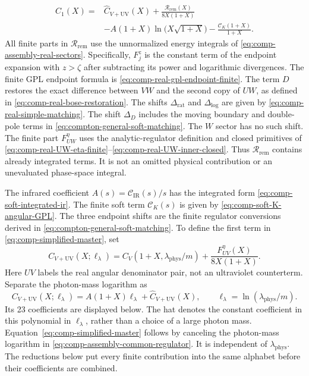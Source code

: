 \begin{equation}
 \begin{aligned}
 C_1(X)={}&\widehat C_{V+\mathrm{UV}}(X)
 +\frac{\mathcal R_{\mathrm{rem}}(X)}{8X(1+X)}\\
 &-A(1+X)\ln\!\bigl(X\sqrt{1+X}\bigr)
 -\frac{\mathcal C_K(1+X)}{1+X}.
 \end{aligned}
 \label{eq:comp-simplified-master}
\end{equation}
All finite parts in $\mathcal R_{\mathrm{rem}}$ use the unnormalized
energy integrals of \eqref{eq:comp-assembly-real-sectors}.
Specifically, $F_j^z$ is the constant term of the endpoint expansion
with $z>\zeta$ after subtracting its power and logarithmic divergences.
The finite GPL endpoint formula is \eqref{eq:comp-real-gpl-endpoint-finite}.
The term $D$ restores the exact difference between $VW$ and the second
copy of $UW$, as defined in \eqref{eq:comp-real-bose-restoration}.
The shifts $\Delta_{\mathrm{rat}}$ and $\Delta_{\log}$ are given by
\eqref{eq:comp-real-simple-matching}.  The shift $\Delta_D$ includes the moving
boundary and double-pole terms in
\eqref{eq:compton-general-soft-matching}.  The $W$ sector has no such
shift.  The finite part $F_{UW}^{\eta}$ uses the analytic-regulator
definition and closed primitives of
\eqref{eq:comp-real-UW-eta-finite}--\eqref{eq:comp-real-UW-inner-closed}.
Thus $\mathcal R_{\mathrm{rem}}$ contains already integrated terms.  It
is not an omitted physical contribution or an unevaluated phase-space
integral.

The infrared coefficient $A(s)=\mathcal C_{\mathrm{IR}}(s)/s$ has
the integrated form \eqref{eq:comp-soft-integrated-ir}. The finite soft term
$\mathcal C_K(s)$ is given by \eqref{eq:comp-soft-K-angular-GPL}.
The three endpoint shifts are the finite regulator conversions
derived in \eqref{eq:compton-general-soft-matching}.
To define the first term in \eqref{eq:comp-simplified-master}, set
\begin{equation}
 C_{V+\mathrm{UV}}(X;\ell_\lambda)
 =C_V(1+X,\lambda_{\mathrm{phys}}/m)
 +\frac{F_{UV}^{\eta}(X)}{8X(1+X)}.
\end{equation}
Here $UV$ labels the real angular denominator pair, not an ultraviolet
counterterm. Separate the photon-mass logarithm as
\begin{equation}
 C_{V+\mathrm{UV}}(X;\ell_\lambda)
 =A(1+X)\ell_\lambda+\widehat C_{V+\mathrm{UV}}(X),
 \qquad \ell_\lambda=\ln(\lambda_{\mathrm{phys}}/m).
 \label{eq:comp-simplified-log-split}
\end{equation}
Its 23 coefficients are displayed below.  The hat denotes the constant
coefficient in this polynomial in $\ell_\lambda$, rather than a choice
of a large photon mass.  Equation~\eqref{eq:comp-simplified-master}
follows by canceling the photon-mass logarithm in
\eqref{eq:comp-assembly-common-regulator}.  It is independent of
$\lambda_{\mathrm{phys}}$.  The reductions below put every finite contribution into the same
alphabet before their coefficients are combined.

